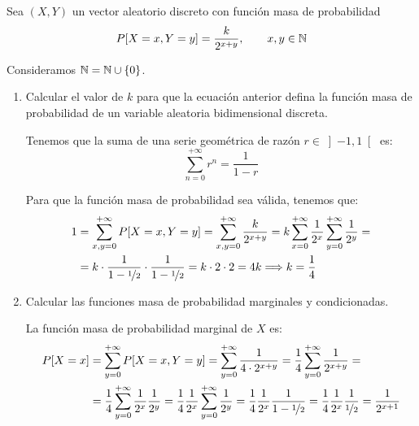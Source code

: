 \begin{ejercicio}
    Sea $(X,Y)$ un vector aleatorio discreto con función masa de probabilidad
    \begin{equation*}
        P[X=x,Y=y] = \dfrac{k}{2^{x+y}},\qquad x,y\in\mathbb{N}
    \end{equation*}
    \begin{observacion}
        Consideramos $\mathbb{N}=\mathbb{N}\cup \{0\}$.
    \end{observacion}
    \begin{enumerate}
        \item Calcular el valor de $k$ para que la ecuación anterior defina la función masa de probabilidad de un variable aleatoria bidimensional discreta.
        
        Tenemos que la suma de una serie geométrica de razón $r\in\left]-1,1\right[$ es:
        \begin{equation*}
            \sum_{n=0}^{+\infty} r^n = \dfrac{1}{1-r}
        \end{equation*}
        
        Para que la función masa de probabilidad sea válida, tenemos que:
        \begin{align*}
            1&=\sum_{x,y=0}^{+\infty} P[X=x,Y=y] = \sum_{x,y=0}^{+\infty} \dfrac{k}{2^{x+y}}
            = k\sum_{x=0}^{+\infty}\dfrac{1}{2^x}\sum_{y=0}^{+\infty}\dfrac{1}{2^y}
            =\\&= k\cdot \dfrac{1}{1-\nicefrac{1}{2}}\cdot \dfrac{1}{1-\nicefrac{1}{2}}
            = k\cdot 2\cdot 2 = 4k
            \Longrightarrow k=\dfrac{1}{4}
        \end{align*}
        \item Calcular las funciones masa de probabilidad marginales y condicionadas.
        
        La función masa de probabilidad marginal de $X$ es:
        \begin{align*}
            P[X=x]&=\sum_{y=0}^{+\infty} P[X=x,Y=y]
            = \sum_{y=0}^{+\infty} \dfrac{1}{4\cdot 2^{x+y}}
            = \dfrac{1}{4}\sum_{y=0}^{+\infty} \dfrac{1}{2^{x+y}}
            =\\&= \dfrac{1}{4}\sum_{y=0}^{+\infty} \dfrac{1}{2^x}\dfrac{1}{2^y}
            = \dfrac{1}{4}\dfrac{1}{2^x}\sum_{y=0}^{+\infty} \dfrac{1}{2^y}
            = \dfrac{1}{4}\dfrac{1}{2^x}\dfrac{1}{1-\nicefrac{1}{2}}
            = \dfrac{1}{4}\dfrac{1}{2^x}\dfrac{1}{\nicefrac{1}{2}}
            = \dfrac{1}{2^{x+1}}
        \end{align*}


\end{enumerate}
\end{ejercicio}
